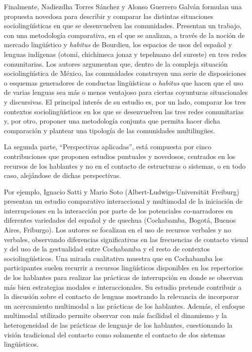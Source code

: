 \documentclass[output=paper]{langscibook}
\begin{document}
Finalmente, Nadiezdha Torres Sánchez y Alonso Guerrero Galván formulan una propuesta novedosa para describir y comparar las distintas situaciones sociolingüísticas en que se desenvuelven las comunidades. Presentan un trabajo, con una metodología comparativa, en el que se analizan, a través de la noción de mercado lingüístico y \textit{habitus} de Bourdieu, los espacios de usos del español y lenguas indígenas (otomí, chichimeca jonaz y tepehuano del sureste) en tres redes comunitarias. Los autores argumentan que, dentro de la compleja situación sociolingüística de México, las comunidades construyen una serie de disposiciones o esquemas generadores de conductas lingüísticas o \textit{habitus} que hacen que el uso de varias lenguas sea más o menos ventajoso para ciertas coyunturas situacionales y discursivas. El principal interés de su estudio es, por un lado, comparar los tres contextos sociolingüísticos en los que se desenvuelven las tres redes comunitarias y, por otro, proponer una metodología conjunta que permita hacer dicha comparación y plantear una tipología de las comunidades multilingües. 

La segunda parte, “Perspectivas aplicadas”, está compuesta por cinco contribuciones que proponen estudios puntuales y novedosos, centrados en los recursos de los hablantes y no en el contacto de estructuras o sistemas, o en todo caso, alejándose de dichas perspectivas. 

Por ejemplo, Ignacio Satti y Mario Soto (Albert-Ludwigs-Universität Freiburg) presentan un estudio comparativo interaccional y multimodal de la iniciación de interrupciones en la interacción por parte de los potenciales co-narradores en diferentes variedades del español y de quechua (Cochabamba, Bogotá, Buenos Aires, Friburgo). Los autores se focalizan en el uso de recursos verbales y no verbales, observando diferencias significativas en las frecuencias de contacto visual y del uso de la gestualidad entre Cochabamba y el resto de contextos sociolingüísticos. Una mirada cualitativa muestra que en Cochabamba los participantes suelen recurrir a recursos lingüísticos disponibles en los repertorios de los hablantes para realizar las prácticas de interrupción en donde se observan más bien estrategias modales e interaccionales. Su estudio pretende contribuir a la discusión sobre el contacto de lenguas mostrando la relevancia de incorporar un acercamiento multimodal a las prácticas de los hablantes. Además, el enfoque multimodal utilizado permite observar con más facilidad el dinamismo y la heterogeneidad de las prácticas de lenguaje de los hablantes, cuestionando la visión tradicional del contacto como solamente el contacto de dos sistemas lingüísticos. 
\end{document}
